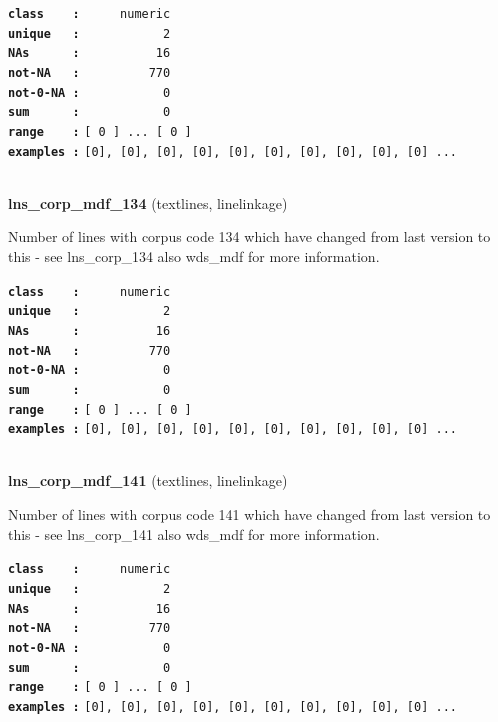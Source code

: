 \documentclass[]{article}
\begin{document}
\textbf{\texttt{class\ \ \ \ :}} \texttt{~~~~~numeric}\\
\textbf{\texttt{unique\ \ \ :}} \texttt{~~~~~~~~~~~2}\\
\textbf{\texttt{NAs\ \ \ \ \ \ :}} \texttt{~~~~~~~~~~16}\\
\textbf{\texttt{not-NA\ \ \ :}} \texttt{~~~~~~~~~770}\\
\textbf{\texttt{not-0-NA\ :}} \texttt{~~~~~~~~~~~0}\\
\textbf{\texttt{sum\ \ \ \ \ \ :}} \texttt{~~~~~~~~~~~0}\\
\textbf{\texttt{range\ \ \ \ :}}
\texttt{{[}\ 0\ {]}\ ...\ {[}\ 0\ {]}}\\
\textbf{\texttt{examples\ :}}
\texttt{{[}0{]},\ {[}0{]},\ {[}0{]},\ {[}0{]},\ {[}0{]},\ {[}0{]},\ {[}0{]},\ {[}0{]},\ {[}0{]},\ {[}0{]}\ ...}\\

~

\textbf{lns\_corp\_mdf\_134} (textlines, linelinkage)

Number of lines with corpus code 134 which have changed from last
version to this - see lns\_corp\_134 also wds\_mdf for more information.

\textbf{\texttt{class\ \ \ \ :}} \texttt{~~~~~numeric}\\
\textbf{\texttt{unique\ \ \ :}} \texttt{~~~~~~~~~~~2}\\
\textbf{\texttt{NAs\ \ \ \ \ \ :}} \texttt{~~~~~~~~~~16}\\
\textbf{\texttt{not-NA\ \ \ :}} \texttt{~~~~~~~~~770}\\
\textbf{\texttt{not-0-NA\ :}} \texttt{~~~~~~~~~~~0}\\
\textbf{\texttt{sum\ \ \ \ \ \ :}} \texttt{~~~~~~~~~~~0}\\
\textbf{\texttt{range\ \ \ \ :}}
\texttt{{[}\ 0\ {]}\ ...\ {[}\ 0\ {]}}\\
\textbf{\texttt{examples\ :}}
\texttt{{[}0{]},\ {[}0{]},\ {[}0{]},\ {[}0{]},\ {[}0{]},\ {[}0{]},\ {[}0{]},\ {[}0{]},\ {[}0{]},\ {[}0{]}\ ...}\\

~

\textbf{lns\_corp\_mdf\_141} (textlines, linelinkage)

Number of lines with corpus code 141 which have changed from last
version to this - see lns\_corp\_141 also wds\_mdf for more information.

\textbf{\texttt{class\ \ \ \ :}} \texttt{~~~~~numeric}\\
\textbf{\texttt{unique\ \ \ :}} \texttt{~~~~~~~~~~~2}\\
\textbf{\texttt{NAs\ \ \ \ \ \ :}} \texttt{~~~~~~~~~~16}\\
\textbf{\texttt{not-NA\ \ \ :}} \texttt{~~~~~~~~~770}\\
\textbf{\texttt{not-0-NA\ :}} \texttt{~~~~~~~~~~~0}\\
\textbf{\texttt{sum\ \ \ \ \ \ :}} \texttt{~~~~~~~~~~~0}\\
\textbf{\texttt{range\ \ \ \ :}}
\texttt{{[}\ 0\ {]}\ ...\ {[}\ 0\ {]}}\\
\textbf{\texttt{examples\ :}}
\texttt{{[}0{]},\ {[}0{]},\ {[}0{]},\ {[}0{]},\ {[}0{]},\ {[}0{]},\ {[}0{]},\ {[}0{]},\ {[}0{]},\ {[}0{]}\ ...}\\
\end{document}
